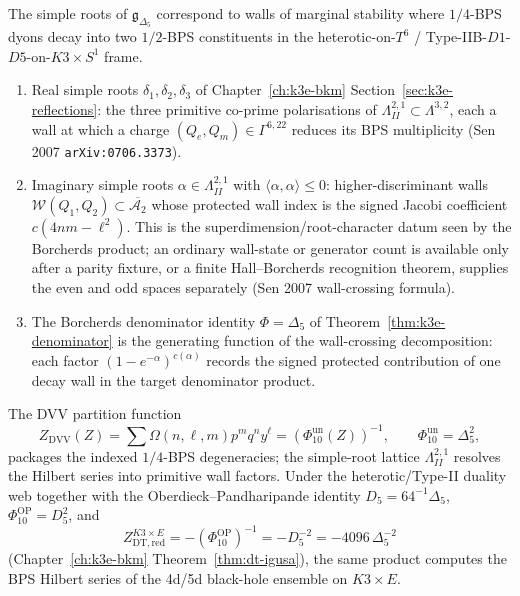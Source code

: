 \begin{theorem}
\label{thm:bkm-simple-roots-walls}
The simple roots of $\mathfrak{g}_{\Delta_5}$ correspond to walls of marginal
stability where $1/4$-BPS dyons decay into two $1/2$-BPS constituents in the
heterotic-on-$T^6$ / Type-IIB-$D1$-$D5$-on-$K3\times S^1$ frame.
\begin{enumerate}[label=\textup{(\roman*)}]
\item Real simple roots $\delta_1,\delta_2,\delta_3$ of
Chapter~\ref{ch:k3e-bkm} Section~\ref{sec:k3e-reflections}: the three
primitive co-prime polarisations of $\Lambda^{2,1}_{II}\subset\Lambda^{3,2}$,
each a wall at which a charge $(Q_e,Q_m)\in\Gamma^{6,22}$ reduces its BPS
multiplicity (Sen 2007 \texttt{arXiv:0706.3373}).
\item Imaginary simple roots $\alpha\in\Lambda^{2,1}_{II}$ with
$\langle\alpha,\alpha\rangle\leq 0$: higher-discriminant walls
$\mathcal{W}(Q_1,Q_2)\subset\overline{\mathcal{A}_2}$ whose protected
wall index is the signed Jacobi coefficient \(c(4nm-\ell^2)\).  This is
the superdimension/root-character datum seen by the Borcherds product; an
ordinary wall-state or generator count is available only after a parity
fixture, or a finite Hall--Borcherds recognition theorem, supplies the
even and odd spaces separately (Sen 2007 wall-crossing formula).
\item The Borcherds denominator identity
$\Phi = \Delta_5$ of Theorem~\ref{thm:k3e-denominator} is the generating
function of the wall-crossing decomposition: each factor
$(1-e^{-\alpha})^{c(\alpha)}$ records the signed protected contribution
of one decay wall in the target denominator product.
\end{enumerate}
The DVV partition function
\[
Z_{\mathrm{DVV}}(Z)
=
\sum\Omega(n,\ell,m)p^m q^n y^\ell
=
(\Phi_{10}^{\mathrm{un}}(Z))^{-1},
\qquad
\Phi_{10}^{\mathrm{un}}=\Delta_5^2,
\]
packages the indexed $1/4$-BPS degeneracies; the simple-root lattice
$\Lambda^{2,1}_{II}$ resolves the Hilbert series into primitive wall factors.
Under the heterotic/Type-II duality web together with the Oberdieck--Pandharipande
identity
$D_5=64^{-1}\Delta_5$, \(\Phi_{10}^{\mathrm{OP}}=D_5^2\), and
\[
 Z^{K3\times E}_{\mathrm{DT,red}}
 =
 -(\Phi_{10}^{\mathrm{OP}})^{-1}
 =
 -D_5^{-2}
 =
 -4096\,\Delta_5^{-2}
\]
(Chapter~\ref{ch:k3e-bkm} Theorem~\ref{thm:dt-igusa}), the same product
computes the BPS Hilbert series of the 4d/5d black-hole ensemble on
$K3\times E$.
\end{theorem}

